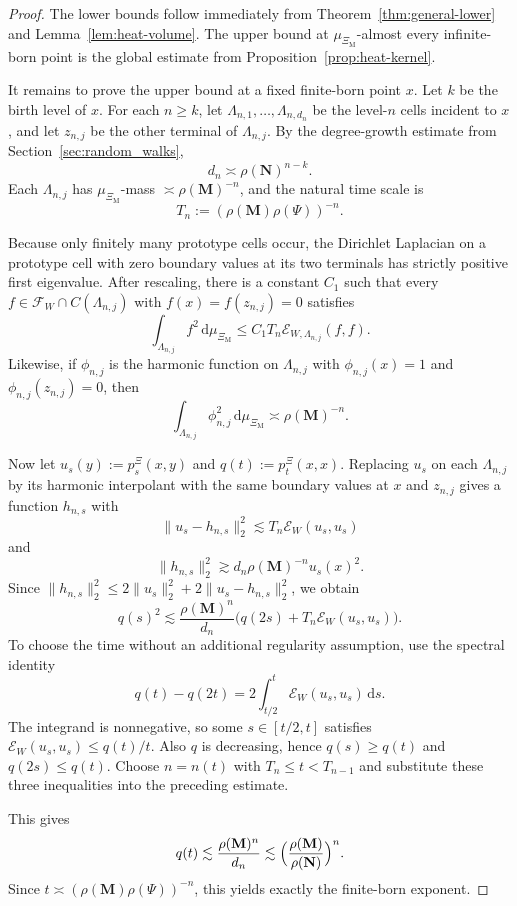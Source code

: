 \documentclass{article}
\theoremstyle{plain}
\theoremstyle{definition}
\begin{document}
\begin{proof}
The lower bounds follow immediately from Theorem~\ref{thm:general-lower} and Lemma~\ref{lem:heat-volume}.
The upper bound at $\mu_{\Xi_{\mathrm M}}$-almost every infinite-born point is the global estimate from Proposition~\ref{prop:heat-kernel}.

It remains to prove the upper bound at a fixed finite-born point $x$.
Let $k$ be the birth level of $x$.
For each $n\ge k$, let $\Lambda_{n,1},\dots,\Lambda_{n,d_n}$ be the level-$n$ cells incident to $x$, and let $z_{n,j}$ be the other terminal of $\Lambda_{n,j}$.
By the degree-growth estimate from Section~\ref{sec:random_walks},
\[
d_n\asymp \rho(\mathbf N)^{n-k}.
\]
Each $\Lambda_{n,j}$ has $\mu_{\Xi_{\mathrm M}}$-mass $\asymp \rho(\mathbf M)^{-n}$, and the natural time scale is
\[
T_n:=(\rho(\mathbf M)\rho(\Psi))^{-n}.
\]

Because only finitely many prototype cells occur, the Dirichlet Laplacian on a prototype cell with zero boundary values at its two terminals has strictly positive first eigenvalue.
After rescaling, there is a constant $C_1$ such that every $f\in \mathcal F_W\cap C(\Lambda_{n,j})$ with $f(x)=f(z_{n,j})=0$ satisfies
\[
\int_{\Lambda_{n,j}}f^2\,\mathrm d\mu_{\Xi_{\mathrm M}}
\le
C_1T_n\mathcal E_{W,\Lambda_{n,j}}(f,f).
\]
Likewise, if $\phi_{n,j}$ is the harmonic function on $\Lambda_{n,j}$ with $\phi_{n,j}(x)=1$ and $\phi_{n,j}(z_{n,j})=0$, then
\[
\int_{\Lambda_{n,j}}\phi_{n,j}^2\,\mathrm d\mu_{\Xi_{\mathrm M}}
\asymp
\rho(\mathbf M)^{-n}.
\]



Now let $u_s(y):=p_s^\Xi(x,y)$ and $q(t):=p_t^\Xi(x,x)$.
Replacing $u_s$ on each $\Lambda_{n,j}$ by its harmonic interpolant with the same boundary values at $x$ and $z_{n,j}$ gives a function $h_{n,s}$ with
\[
\|u_s-h_{n,s}\|_2^2
\lesssim
T_n\mathcal E_W(u_s,u_s)
\]
and
\[
\|h_{n,s}\|_2^2
\gtrsim
d_n\rho(\mathbf M)^{-n}u_s(x)^2.
\]
Since $\|h_{n,s}\|_2^2\le 2\|u_s\|_2^2+2\|u_s-h_{n,s}\|_2^2$, we obtain
\[
q(s)^2
\lesssim
\frac{\rho(\mathbf M)^n}{d_n}\bigl(q(2s)+T_n\mathcal E_W(u_s,u_s)\bigr).
\]
\begingroup\color{red}
To choose the time without an additional regularity assumption, use
the spectral identity
\[
q(t)-q(2t)=2\int_{t/2}^{t}\mathcal E_W(u_s,u_s)\,\mathrm ds.
\]
The integrand is nonnegative, so some $s\in[t/2,t]$ satisfies
$\mathcal E_W(u_s,u_s)\le q(t)/t$. Also $q$ is decreasing, hence
$q(s)\ge q(t)$ and $q(2s)\le q(t)$.
Choose $n=n(t)$ with $T_n\le t<T_{n-1}$ and substitute these three
inequalities into the preceding estimate.
\endgroup{}

This gives
\[
q(t)\lesssim \frac{\rho(\mathbf M)^n}{d_n}\lesssim \Bigl(\frac{\rho(\mathbf M)}{\rho(\mathbf N)}\Bigr)^n.
\]
Since $t\asymp (\rho(\mathbf M)\rho(\Psi))^{-n}$, this yields exactly the finite-born exponent.
\end{proof}
\end{document}
